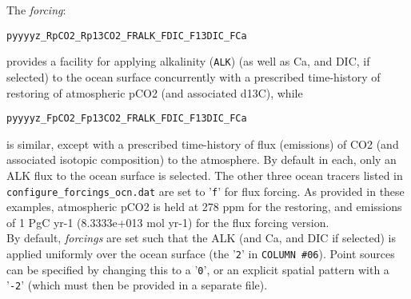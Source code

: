 \documentclass[10pt,twoside]{article}
\begin{document}
\begin{compactenum}

\item The \textit{forcing}:
\vspace{-5pt}\begin{verbatim}
pyyyyz_RpCO2_Rp13CO2_FRALK_FDIC_F13DIC_FCa
\end{verbatim}\vspace{-5pt}
provides a facility for applying alkalinity (\texttt{ALK}) (as well as Ca, and DIC, if selected) to the ocean surface concurrently with a prescribed time-history of restoring of atmospheric pCO2 (and associated d13C), while
\vspace{-5pt}\begin{verbatim}
pyyyyz_FpCO2_Fp13CO2_FRALK_FDIC_F13DIC_FCa
\end{verbatim}\vspace{-5pt}
is similar, except with a prescribed time-history of flux (emissions) of CO2 (and associated isotopic composition) to the atmosphere.
By default in each, only an ALK flux to the ocean surface is selected. The other three ocean tracers listed in \texttt{configure\_forcings\_ocn.dat} are set to '\texttt{f}' for flux forcing. As provided in these examples, atmospheric pCO2 is held at 278 ppm for the restoring, and emissions of 1 PgC yr-1 (8.3333e+013 mol yr-1) for the flux forcing version.
\\ By default, \textit{forcings} are set such that the ALK (and Ca, and DIC if selected) is applied uniformly over the ocean surface (the '\texttt{2}' in \texttt{COLUMN \#06}). Point sources can be specified by changing this to a '\texttt{0}', or an explicit spatial pattern with a '\texttt{-2}' (which must then be provided in a separate file).


\end{compactenum}
\end{document}
